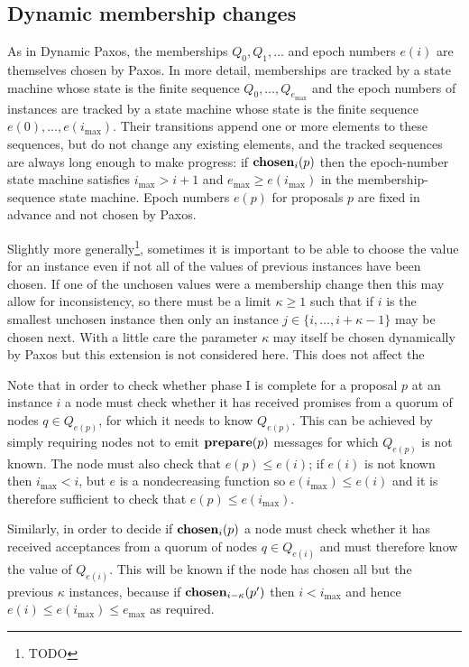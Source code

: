 \documentclass[journal]{IEEEtran}
\begin{document}
\subsection{Dynamic membership changes}

As in Dynamic Paxos, the memberships $Q_0, Q_1, \ldots$ and epoch numbers
$e(i)$ are themselves chosen by Paxos. In more detail, memberships are tracked
by a state machine whose state is the finite sequence $Q_0, \ldots,
Q_{e_\mathrm{max}}$ and the epoch numbers of instances are tracked by a state
machine whose state is the finite sequence $e(0), \ldots, e(i_\mathrm{max})$.
Their transitions append one or more elements to these sequences, but do not
change any existing elements, and the tracked sequences are always long enough
to make progress: if $\mathbf{chosen}_{i}(p)$ then the epoch-number state machine
satisfies $i_\mathrm{max} > i+1$ and $e_\mathrm{max} \ge e(i_\mathrm{max})$ in
the membership-sequence state machine. Epoch numbers $e(p)$ for proposals $p$
are fixed in advance and not chosen by Paxos.

Slightly more generally\footnote{TODO}, sometimes it is important to be able to
choose the value for an instance even if not all of the values of previous
instances have been chosen. If one of the unchosen values were a membership
change then this may allow for inconsistency, so there must be a limit $\kappa
\ge 1$ such that if $i$ is the smallest unchosen instance then only an instance
${j \in \{ i, \ldots, i + \kappa - 1 \}}$ may be chosen next. With a little
care the parameter $\kappa$ may itself be chosen dynamically by Paxos but this
extension is not considered here. This does not affect the 

Note that in order to check whether phase I is complete for a proposal $p$ at
an instance $i$ a node must check whether it has received promises from a
quorum of nodes $q \in Q_{e(p)}$, for which it needs to know $Q_{e(p)}$. This
can be achieved by simply requiring nodes not to emit $\mathbf{prepare}(p)$ messages for
which $Q_{e(p)}$ is not known. The node must also check that $e(p) \le e(i)$;
if $e(i)$ is not known then $i_\mathrm{max} < i$, but $e$ is a nondecreasing
function so $e(i_\mathrm{max}) \le e(i)$ and it is therefore sufficient to
check that $e(p) \le e(i_\mathrm{max})$.

Similarly, in order to decide if $\mathbf{chosen}_{i}(p)$ a node must check whether it
has received acceptances from a quorum of nodes $q \in Q_{e(i)}$ and must
therefore know the value of $Q_{e(i)}$. This will be known if the node has
chosen all but the previous $\kappa$ instances, because if
$\mathbf{chosen}_{i-\kappa}(p')$ then $i < i_\mathrm{max}$ and hence ${e(i) \le
e(i_\mathrm{max}) \le e_\mathrm{max}}$ as required.
\end{document}
